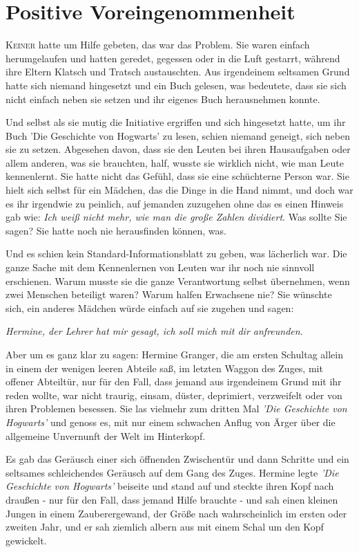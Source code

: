 \chapter{Positive Voreingenommenheit}

\lettrine{K}{einer} hatte um Hilfe gebeten, das war das Problem. Sie waren
einfach herumgelaufen und hatten geredet, gegessen oder in die Luft gestarrt,
während ihre Eltern Klatsch und Tratsch austauschten. Aus irgendeinem seltsamen
Grund hatte sich niemand hingesetzt und ein Buch gelesen, was bedeutete, dass
sie sich nicht einfach neben sie setzen und ihr eigenes Buch herausnehmen
konnte.

Und selbst als sie mutig die Initiative ergriffen und sich hingesetzt hatte, um
ihr Buch 'Die Geschichte von Hogwarts' zu lesen, schien niemand geneigt, sich
neben sie zu setzen. Abgesehen davon, dass sie den Leuten bei ihren Hausaufgaben
oder allem anderen, was sie brauchten, half, wusste sie wirklich nicht, wie man
Leute kennenlernt. Sie hatte nicht das Gefühl, dass sie eine schüchterne Person
war. Sie hielt sich selbst für ein Mädchen, das die Dinge in die Hand nimmt, und
doch war es ihr irgendwie zu peinlich, auf jemanden zuzugehen ohne das es einen
Hinweis gab wie: \glqq{}\emph{Ich weiß nicht mehr, wie man die große Zahlen
dividiert}\grqq{}. \glqq{}Was sollte Sie sagen? Sie hatte noch nie herausfinden
können, was.

Und es schien kein Standard-Informationsblatt zu geben, was lächerlich war. Die
ganze Sache mit dem Kennenlernen von Leuten war ihr noch nie sinnvoll
erschienen. Warum musste sie die ganze Verantwortung selbst übernehmen, wenn
zwei Menschen beteiligt waren? Warum halfen Erwachsene nie? Sie wünschte sich,
ein anderes Mädchen würde einfach auf sie zugehen und sagen:

\glqq{}\emph{Hermine, der Lehrer hat mir gesagt, ich soll mich mit dir
anfreunden}.\grqq{}

Aber um es ganz klar zu sagen: Hermine Granger, die am ersten Schultag allein in
einem der wenigen leeren Abteile saß, im letzten Waggon des Zuges, mit offener
Abteiltür, nur für den Fall, dass jemand aus irgendeinem Grund mit ihr reden
wollte, war nicht traurig, einsam, düster, deprimiert, verzweifelt oder von
ihren Problemen besessen. Sie las vielmehr zum dritten Mal \emph{'Die Geschichte
von Hogwarts'} und genoss es, mit nur einem schwachen Anflug von Ärger über die
allgemeine Unvernunft der Welt im Hinterkopf.

Es gab das Geräusch einer sich öffnenden Zwischentür und dann Schritte und ein
seltsames schleichendes Geräusch auf dem Gang des Zuges. Hermine legte
\emph{'Die Geschichte von Hogwarts'} beiseite und stand auf und steckte ihren
Kopf nach draußen - nur für den Fall, dass jemand Hilfe brauchte - und sah einen
kleinen Jungen in einem Zauberergewand, der Größe nach wahrscheinlich im ersten
oder zweiten Jahr, und er sah ziemlich albern aus mit einem Schal um den Kopf
gewickelt.

